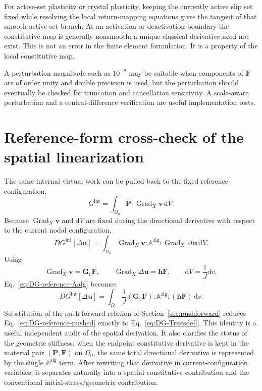 \documentclass[11pt,a4paper]{article}
\newcommand{\bs}[1]{\boldsymbol{#1}}
\newcommand{\dd}{\mathrm{d}}
\newcommand{\Grad}{\operatorname{Grad}}
\newcommand{\F}{\bs{F}}
\newcommand{\Pstress}{\bs{P}}
\newcommand{\Aalg}{\mathbb{A}^{\mathrm{alg}}}
\begin{document}
For active-set plasticity or crystal plasticity, keeping the currently active slip set fixed while resolving the local return-mapping equations gives the tangent of that smooth active-set branch. At an activation or deactivation boundary the constitutive map is generally nonsmooth; a unique classical derivative need not exist. This is not an error in the finite element formulation. It is a property of the local constitutive map.

A perturbation magnitude such as $10^{-8}$ may be suitable when components of $\F$ are of order unity and double precision is used, but the perturbation should eventually be checked for truncation and cancellation sensitivity. A scale-aware perturbation and a central-difference verification are useful implementation tests.


\section{Reference-form cross-check of the spatial linearization}
\label{app:reference-crosscheck}

The same internal virtual work can be pulled back to the fixed reference configuration,
\begin{equation}
G^{\mathrm{int}}
=
\int_{\Omega_0}
\Pstress:\Grad_X\bs{v}\,\dd V.
\label{eq:weak-reference-crosscheck}
\end{equation}
Because $\Grad_X\bs{v}$ and $\dd V$ are fixed during the directional derivative with respect to the current nodal configuration,
\begin{equation}
\boxed{
DG^{\mathrm{int}}[\Delta\bs{u}]
=
\int_{\Omega_0}
\Grad_X\bs{v}:\Aalg:\Grad_X\Delta\bs{u}\,\dd V
}.
\label{eq:DG-reference-Aalg}
\end{equation}
Using
\begin{equation}
\Grad_X\bs{v}=\bs G_v\F,
\qquad
\Grad_X\Delta\bs{u}=\bs{h}\F,
\qquad
\dd V=\frac{1}{J}\dd v,
\end{equation}
Eq.~\eqref{eq:DG-reference-Aalg} becomes
\begin{equation}
DG^{\mathrm{int}}[\Delta\bs{u}]
=
\int_{\Omega_t}
\frac{1}{J}
(\bs G_v\F):\Aalg:(\bs{h}\F)\,\dd v.
\label{eq:DG-reference-pushed}
\end{equation}
Substitution of the push-forward relation of Section~\ref{sec:pushforward} reduces Eq.~\eqref{eq:DG-reference-pushed} exactly to Eq.~\eqref{eq:DG-Truesdell}. This identity is a useful independent audit of the spatial derivation. It also clarifies the status of the geometric stiffness: when the endpoint constitutive derivative is kept in the material pair $(\Pstress,\F)$ on $\Omega_0$, the same total directional derivative is represented by the single $\Aalg$ term. After rewriting that derivative in current-configuration variables, it separates naturally into a spatial constitutive contribution and the conventional initial-stress/geometric contribution.
\end{document}
